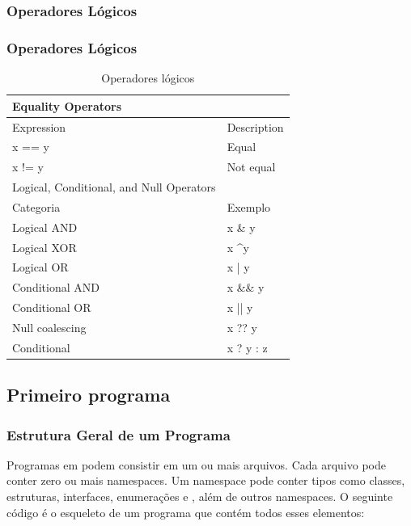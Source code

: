 \documentclass{beamer}
\begin{document}
\subsubsection{Operadores Lógicos}
\begin{frame}
\frametitle{Operadores Lógicos}
\begin{table}[]
	\centering	
	\begin{tabular}{|l|l|}
		\hline
		Equality Operators                       &  \\ \hline
		Expression                               & Description          \\ \hline
		x == y                                   & Equal                \\ \hline
		x != y                                   & Not equal            \\ \hline
		Logical, Conditional, and Null Operators &                      \\ \hline
		Categoria                                & Exemplo            \\ \hline
		Logical AND                              & x \& y              \\ \hline
		Logical XOR                              & x \textasciicircum  y \\ \hline
		Logical OR                               & x | y                 \\ \hline
		Conditional AND                          & x \&\& y              \\ \hline
		Conditional OR                           & x || y                \\ \hline
		Null coalescing                          & x ?? y                \\ \hline
		Conditional                              & x ? y : z             \\ \hline
	\end{tabular}
\caption{Operadores lógicos}
\label{tab:OperadoresLogicos}
\end{table}
\end{frame}



\subsection{Primeiro programa}


\begin{frame}[fragile]
\frametitle{Estrutura Geral de um Programa}
\begin{outline}
	\1 Programas em \CS podem consistir em um ou mais arquivos.
	\1 Cada arquivo pode conter zero ou mais namespaces. 
	\1 Um namespace pode conter tipos como classes, estruturas, interfaces, enumerações e , além de outros namespaces. 
	\1 O seguinte código é o esqueleto de um programa \CS que contém todos esses elementos:
\end{outline}
\end{frame}
\end{document}
